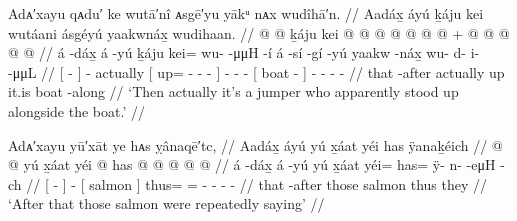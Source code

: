 \ex\label{ex:100-106-jumper-stood-up}%
%
\begingl
	\glpreamble	Adᴀ′xayu qᴀdu′ ke wutā′nî ᴀsgē′yu yākᵘ nᴀx wudîhā′n. //
	\glpreamble	Aadáx̱ áyú ḵáju kei wutáani ásgéyú yaakwnáx̱ wudihaan. //
	\gla	{}  @ {} {}  @ {} 
		ḵáju
		{} kei @  @ {} @ {} @ {} {}
		 @ {} @ {} @ {} +
		{}  @ {} {}
		 @ {} @ {} @ {} @ {} //
	\glb	{} á -dáx̱ {} á -yú
		ḵáju
		{} kei= wu-  -μμH -í {}
		á -sí -gí -yú
		{} yaakw -náx̱ {}
		wu- d- i-  -μμL //
	\glc	{}[  - {}]  - 
		actually
		{}[ up= -  - - {}]
		 - - -
		{}[ boat - {}]
		- - -  - //
	\gld	{} that -after {}  {}
		actually
		{} up  {} {} {} {}
		it.is \· {} {}
		{} boat -along {}
		 {} {} {} {} //
	\glft	‘Then actually it’s a jumper who apparently stood up alongside the boat.’
		//
\endgl
\xe

\ex\label{ex:100-107-salmon-saying}%
%
\begingl
	\glpreamble	Adᴀ′xayu yū′xāt ye hᴀs ỵânaqē′tc, //
	\glpreamble	Aadáx̱ áyú yú x̱áat yéi has ÿanaḵéich //
	\gla	{}  @ {} {}  @ {}
		{} yú x̱áat {}
		yéi @ has @  @ {} @ {} @ {} @ {} //
	\glb	{} á -dáx̱ {} á -yú
		{} yú x̱áat {}
		yéi= has= ÿ- n-  -eμH -ch //
	\glc	{}[  - {}]  - 
		{}[  salmon {}]
		thus= = - -  - - //
	\gld	{} that -after {}  {} 
		{} those salmon {}
		thus they  {} {} {} {} //
	\glft	‘After that those salmon were repeatedly saying’
		//
\endgl
\xe

